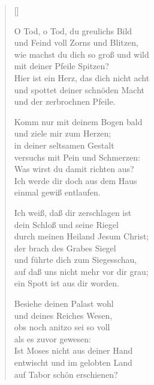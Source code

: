 \begin{multicols}{2}
\settowidth{\versewidth}{Ich weiß, daß dir zerschlagen ist}
\begin{verse}[\versewidth]

 O Tod, o Tod, du greulichs Bild\\
und Feind voll Zorns und Blitzen,\\
wie machst du dich so groß und wild\\
mit deiner Pfeile Spitzen?\\
Hier ist ein Herz, das dich nicht acht\\
und spottet deiner schnöden Macht\\
und der zerbrochnen Pfeile.

 Komm nur mit deinem Bogen bald\\
und ziele mir zum Herzen;\\
in deiner seltsamen Gestalt\\
versuchs mit Pein und Schmerzen:\\
Was wirst du damit richten aus?\\
Ich werde dir doch aus dem Haus\\
einmal gewiß entlaufen.

 Ich weiß, daß dir zerschlagen ist\\
dein Schloß und seine Riegel\\
durch meinen Heiland Jesum Christ;\\
der brach des Grabes Siegel\\
und führte dich zum Siegesschau,\\
auf daß uns nicht mehr vor dir grau;\\
ein Spott ist aus dir worden.

 Besiehe deinen Palast wohl\\
und deines Reiches Wesen,\\
obs noch anitzo sei so voll\\
als es zuvor gewesen:\\
Ist Moses nicht aus deiner Hand\\
entwischt und im gelobten Land\\
auf Tabor schön erschienen?


\end{verse}
\end{multicols}
